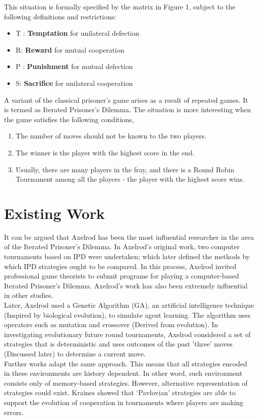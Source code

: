 \documentclass[a4paper]{article}
\begin{document}
	This situation is formally specified by the matrix in Figure 1, subject to the following definitions and restrictions:
	\begin{itemize}
		\item T : \textbf{Temptation} for unilateral defection
		\item R: \textbf{Reward} for mutual cooperation
		\item P : \textbf{Punishment} for mutual defection
		\item S: \textbf{Sacrifice} for unilateral cooperation	
	\end{itemize}
	
	A variant of the classical prisoner's game arises as a result of repeated games. It is termed as Iterated Prisoner's Dilemma. The situation is more interesting when the game satisfies the following conditions,
	\begin{enumerate}
	\item The number of moves should not be known to the two players.
	\item The winner is the player with the highest score in the end.
	\item Usually, there are many players in the fray, and there is a Round Robin Tournament among all the players - the player with the highest score wins.		
	\end{enumerate}
	
	\section{Existing Work}
	
	It can be argued that Axelrod has been the most influential researcher in the area of the Iterated Prisoner's Dilemma. In Axelrod's original work, two computer tournaments based on IPD were undertaken; which later defined the methods by which IPD strategies ought to be compared. In this process, Axelrod invited professional game theorists to submit programs for playing a computer-based Iterated Prisoner's Dilemma. Axelrod's work has also been extremely influential in other studies.\\
	Later, Axelrod used a Genetic Algorithm (GA), an artificial intelligence technique (Inspired by biological evolution), to simulate agent learning. The algorithm uses operators such as mutation and crossover (Derived from evolution). In investigating evolutionary future round tournaments, Axelrod considered a set of strategies that is deterministic and uses outcomes of the past 'three' moves (Discussed later) to determine a current move.\\
	Further works adapt the same approach. This means that all strategies encoded in these environments are history dependent. In other word, such environment consists only of memory-based strategies. However, alternative representation of strategies could exist. Kraines showed that ‘Pavlovian’ strategies are able to support the evolution of cooperation in tournaments where players are making errors. 
	
\end{document}
